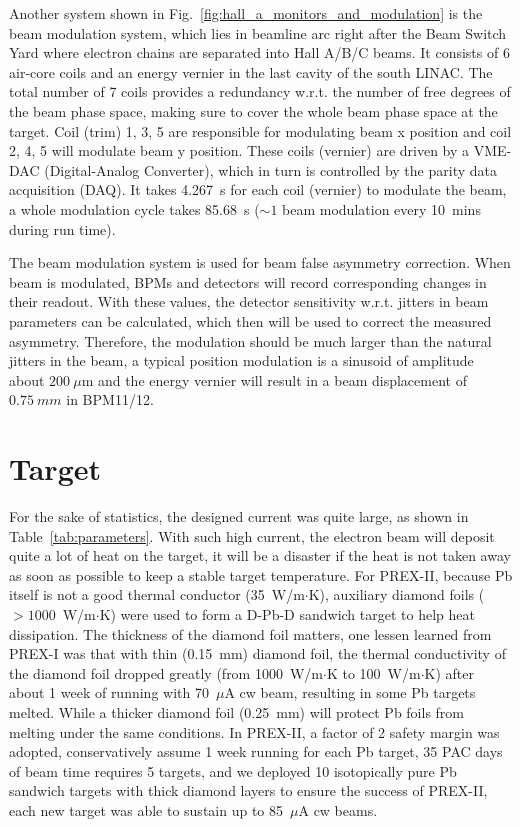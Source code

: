 Another system shown in Fig.~\ref{fig:hall_a_monitors_and_modulation} is the
beam modulation system, which lies in beamline arc right after the Beam Switch Yard 
where electron chains are separated into Hall A/B/C beams.
It consists of 6 air-core coils and an energy vernier in the last cavity of the south LINAC.
The total number of 7 coils provides a redundancy w.r.t. the number of free degrees 
of the beam phase space, making sure to cover the whole beam phase space at the target.  
Coil (trim) 1, 3, 5 are responsible for modulating beam x position and coil 
2, 4, 5 will modulate beam y position.
These coils (vernier) are driven by a VME-DAC (Digital-Analog Converter), 
which in turn is controlled by the parity data acquisition (DAQ).
It takes 4.267~s for each coil (vernier) to modulate the beam, a whole 
modulation cycle takes 85.68~s ($\sim 1$ beam modulation every 10~mins during
run time). 

The beam modulation system is used for beam false asymmetry correction. 
When beam is modulated, BPMs and detectors will record corresponding
changes in their readout. With these values, the detector sensitivity w.r.t. jitters 
in beam parameters can be calculated, which then will be used to correct the
measured asymmetry. Therefore, the modulation should be much larger than the natural
jitters in the beam, a typical position modulation is a sinusoid of amplitude about $200\ \mu$m 
and the energy vernier will result in a beam displacement of $0.75 \ mm$ in BPM11/12.

\section{Target}
For the sake of statistics, the designed current was quite large, as shown in
Table~\ref{tab:parameters}. With such high current, the electron beam will deposit quite
a lot of heat on the target, it will be a disaster if the heat is not taken away 
as soon as possible to keep a stable target temperature.
For PREX-II, because Pb itself is not a good thermal conductor (35~W/m$\cdot$K),
auxiliary diamond foils ($> 1000$~W/m$\cdot$K) were used to form a D-Pb-D sandwich target to help heat
dissipation. The thickness of the diamond foil matters, one lessen learned 
from PREX-I was that with thin (0.15~mm) diamond foil, the thermal conductivity
of the diamond foil dropped greatly (from 1000~W/m$\cdot$K to 100~W/m$\cdot$K) after about 
1 week of running with 70~$\mu$A cw beam, resulting in some Pb targets melted. 
While a thicker diamond foil (0.25~mm) will protect Pb foils from melting 
under the same conditions. In PREX-II, a factor of 2 safety margin was
adopted, conservatively assume 1 week running for each Pb target, 35 PAC days of beam time
requires 5 targets, and we deployed 10 isotopically pure Pb sandwich targets with 
thick diamond layers to ensure the success of PREX-II, each new target was able
to sustain up to 85~$\mu$A cw beams.

